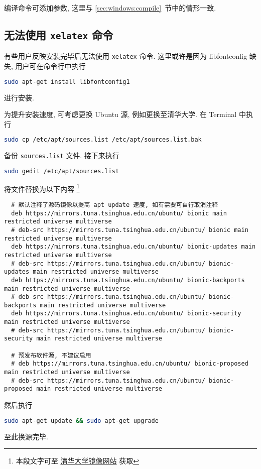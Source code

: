编译命令可添加参数, 这里与 \ref{sec:windows:compile}~节中的情形一致.

\subsection{无法使用 \texttt{xelatex} 命令}\label{subsec:ubuntu:xelatexfail}

有些用户反映安装完毕后无法使用 \texttt{xelatex} 命令.
这里或许是因为 libfontconfig 缺失, 用户可在命令行中执行 
\begin{lstlisting}[language=bash]
  sudo apt-get install libfontconfig1
\end{lstlisting}
进行安装.

为提升安装速度, 可考虑更换 Ubuntu 源, 例如更换至清华大学.
在 \textsf{Terminal} 中执行
\begin{lstlisting}[language = bash]
  sudo cp /etc/apt/sources.list /etc/apt/sources.list.bak
\end{lstlisting}
备份 \texttt{sources.list} 文件.
接下来执行
\begin{lstlisting}[language = bash]
  sudo gedit /etc/apt/sources.list
\end{lstlisting}
将文件替换为以下内容%
\footnote{本段文字可至%
  \href{https://mirrors.tuna.tsinghua.edu.cn/help/ubuntu/}{清华大学镜像网站}%
  获取}
\begin{lstlisting}
  # 默认注释了源码镜像以提高 apt update 速度, 如有需要可自行取消注释
  deb https://mirrors.tuna.tsinghua.edu.cn/ubuntu/ bionic main restricted universe multiverse
  # deb-src https://mirrors.tuna.tsinghua.edu.cn/ubuntu/ bionic main restricted universe multiverse
  deb https://mirrors.tuna.tsinghua.edu.cn/ubuntu/ bionic-updates main restricted universe multiverse
  # deb-src https://mirrors.tuna.tsinghua.edu.cn/ubuntu/ bionic-updates main restricted universe multiverse
  deb https://mirrors.tuna.tsinghua.edu.cn/ubuntu/ bionic-backports main restricted universe multiverse
  # deb-src https://mirrors.tuna.tsinghua.edu.cn/ubuntu/ bionic-backports main restricted universe multiverse
  deb https://mirrors.tuna.tsinghua.edu.cn/ubuntu/ bionic-security main restricted universe multiverse
  # deb-src https://mirrors.tuna.tsinghua.edu.cn/ubuntu/ bionic-security main restricted universe multiverse
  
  # 预发布软件源, 不建议启用
  # deb https://mirrors.tuna.tsinghua.edu.cn/ubuntu/ bionic-proposed main restricted universe multiverse
  # deb-src https://mirrors.tuna.tsinghua.edu.cn/ubuntu/ bionic-proposed main restricted universe multiverse
\end{lstlisting}
然后执行
\begin{lstlisting}[language = bash]
  sudo apt-get update && sudo apt-get upgrade
\end{lstlisting}
至此换源完毕.
